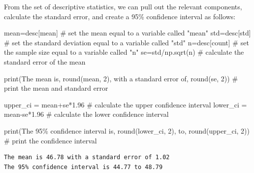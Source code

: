 \documentclass[
  letterpaper,
  DIV=11,
  numbers=noendperiod]{scrreprt}
\newenvironment{Shaded}{\begin{snugshade}}{\end{snugshade}}
\newcommand{\BuiltInTok}[1]{\textcolor[rgb]{0.00,0.23,0.31}{#1}}
\newcommand{\CommentTok}[1]{\textcolor[rgb]{0.37,0.37,0.37}{#1}}
\newcommand{\DecValTok}[1]{\textcolor[rgb]{0.68,0.00,0.00}{#1}}
\newcommand{\FloatTok}[1]{\textcolor[rgb]{0.68,0.00,0.00}{#1}}
\newcommand{\NormalTok}[1]{\textcolor[rgb]{0.00,0.23,0.31}{#1}}
\newcommand{\OperatorTok}[1]{\textcolor[rgb]{0.37,0.37,0.37}{#1}}
\newcommand{\SpecialCharTok}[1]{\textcolor[rgb]{0.37,0.37,0.37}{#1}}
\newcommand{\StringTok}[1]{\textcolor[rgb]{0.13,0.47,0.30}{#1}}
\begin{document}
From the set of descriptive statistics, we can pull out the relevant
components, calculate the standard error, and create a 95\% confidence
interval as follows:

\begin{Shaded}
\begin{Highlighting}[]
\NormalTok{mean}\OperatorTok{=}\NormalTok{desc[}\StringTok{\textquotesingle{}mean\textquotesingle{}}\NormalTok{] }\CommentTok{\# set the mean equal to a variable called "mean"}
\NormalTok{std}\OperatorTok{=}\NormalTok{desc[}\StringTok{\textquotesingle{}std\textquotesingle{}}\NormalTok{] }\CommentTok{\# set the standard deviation equal to a variable called "std"}
\NormalTok{n}\OperatorTok{=}\NormalTok{desc[}\StringTok{\textquotesingle{}count\textquotesingle{}}\NormalTok{] }\CommentTok{\# set the sample size equal to a variable called "n"}
\NormalTok{se}\OperatorTok{=}\NormalTok{std}\OperatorTok{/}\NormalTok{np.sqrt(n) }\CommentTok{\# calculate the standard error of the mean}

\BuiltInTok{print}\NormalTok{(}\StringTok{\textquotesingle{}The mean is\textquotesingle{}}\NormalTok{, }\BuiltInTok{round}\NormalTok{(mean, }\DecValTok{2}\NormalTok{), }\StringTok{\textquotesingle{}with a standard error of\textquotesingle{}}\NormalTok{, }\BuiltInTok{round}\NormalTok{(se, }\DecValTok{2}\NormalTok{)) }\CommentTok{\# print the mean and standard error}

\NormalTok{upper\_ci }\OperatorTok{=}\NormalTok{ mean}\OperatorTok{+}\NormalTok{se}\OperatorTok{*}\FloatTok{1.96} \CommentTok{\# calculate the upper confidence interval}
\NormalTok{lower\_ci }\OperatorTok{=}\NormalTok{ mean}\OperatorTok{{-}}\NormalTok{se}\OperatorTok{*}\FloatTok{1.96} \CommentTok{\# calculate the lower confidence interval}

\BuiltInTok{print}\NormalTok{(}\StringTok{\textquotesingle{}The 95}\SpecialCharTok{\% c}\StringTok{onfidence interval is\textquotesingle{}}\NormalTok{, }\BuiltInTok{round}\NormalTok{(lower\_ci, }\DecValTok{2}\NormalTok{), }\StringTok{\textquotesingle{}to\textquotesingle{}}\NormalTok{, }\BuiltInTok{round}\NormalTok{(upper\_ci, }\DecValTok{2}\NormalTok{)) }\CommentTok{\# print the confidence interval}
\end{Highlighting}
\end{Shaded}

\begin{verbatim}
The mean is 46.78 with a standard error of 1.02
The 95% confidence interval is 44.77 to 48.79
\end{verbatim}
\end{document}
